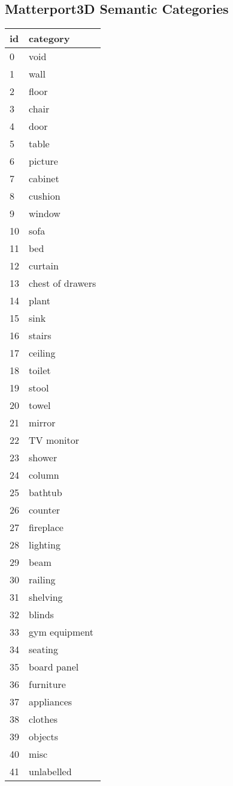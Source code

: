 \begin{appendices}
\chapter{Matterport3D Semantic Categories}
\begin{table}[h!]
\label{app:categories}
\centering
\begin{adjustbox}{totalheight=.65\textheight}
\begin{tabular}{|l|l|}
\hline
id & category \\
\hline
	0 & void \\
	1 & wall \\
	2 & floor \\
	3 & chair \\
	4 & door \\
	5 & table \\
	6 & picture \\
	7 & cabinet \\
	8 & cushion \\
	9 & window \\
	10 & sofa \\
	11 & bed \\
	12 & curtain \\
	13 & chest of drawers \\
	14 & plant \\
	15 & sink \\
	16 & stairs \\
	17 & ceiling \\
	18 & toilet \\
	19 & stool \\
	20 & towel \\
	21 & mirror \\
	22 & TV monitor \\
	23 & shower \\
	24 & column \\
	25 & bathtub \\
	26 & counter \\
	27 & fireplace \\
	28 & lighting \\
	29 & beam \\
	30 & railing \\
	31 & shelving \\
	32 & blinds \\
	33 & gym equipment \\
	34 & seating \\
	35 & board panel \\
	36 & furniture \\
	37 & appliances \\
	38 & clothes \\
	39 & objects \\
	40 & misc \\
	41 & unlabelled \\
	\hline
\end{tabular}
\end{adjustbox}
\end{table}
\end{appendices}
